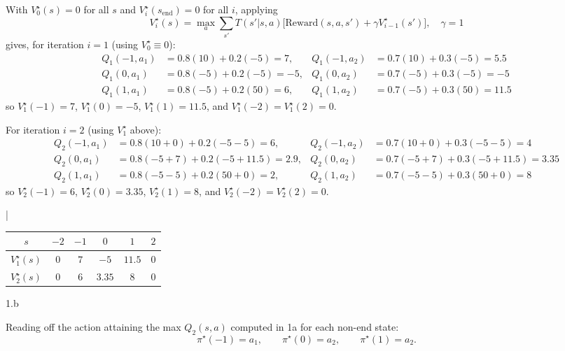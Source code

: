 \begin{answer}
  With $V^\star_0(s) = 0$ for all $s$ and $V^\star_i(s_\text{end}) = 0$ for all $i$, applying
  $$V^\star_i(s) = \max_a \sum_{s'} T(s'\vert s,a)\big[\text{Reward}(s,a,s') + \gamma V^\star_{i-1}(s')\big], \quad \gamma = 1$$
  gives, for iteration $i=1$ (using $V^\star_0 \equiv 0$):
  \begin{align*}
    Q_1(-1,a_1) &= 0.8(10) + 0.2(-5) = 7, &
    Q_1(-1,a_2) &= 0.7(10) + 0.3(-5) = 5.5 \\
    Q_1(0,a_1) &= 0.8(-5) + 0.2(-5) = -5, &
    Q_1(0,a_2) &= 0.7(-5) + 0.3(-5) = -5 \\
    Q_1(1,a_1) &= 0.8(-5) + 0.2(50) = 6, &
    Q_1(1,a_2) &= 0.7(-5) + 0.3(50) = 11.5
  \end{align*}
  so $V^\star_1(-1) = 7$, $V^\star_1(0) = -5$, $V^\star_1(1) = 11.5$, and $V^\star_1(-2) = V^\star_1(2) = 0$.

  For iteration $i=2$ (using $V^\star_1$ above):
  \begin{align*}
    Q_2(-1,a_1) &= 0.8(10+0) + 0.2(-5-5) = 6, &
    Q_2(-1,a_2) &= 0.7(10+0) + 0.3(-5-5) = 4 \\
    Q_2(0,a_1) &= 0.8(-5+7) + 0.2(-5+11.5) = 2.9, &
    Q_2(0,a_2) &= 0.7(-5+7) + 0.3(-5+11.5) = 3.35 \\
    Q_2(1,a_1) &= 0.8(-5-5) + 0.2(50+0) = 2, &
    Q_2(1,a_2) &= 0.7(-5-5) + 0.3(50+0) = 8
  \end{align*}
  so $V^\star_2(-1) = 6$, $V^\star_2(0) = 3.35$, $V^\star_2(1) = 8$, and $V^\star_2(-2) = V^\star_2(2) = 0$.

  \begin{center}
  \lstDeleteShortInline|
  \begin{tabular}{|c|c|c|c|c|c|}
    \hline
    $s$ & $-2$ & $-1$ & $0$ & $1$ & $2$ \\
    \hline
    $V^\star_1(s)$ & $0$ & $7$ & $-5$ & $11.5$ & $0$ \\
    \hline
    $V^\star_2(s)$ & $0$ & $6$ & $3.35$ & $8$ & $0$ \\
    \hline
  \end{tabular}
  \end{center}
\end{answer}
\clearpage

\LARGE
1.b
\normalsize

\begin{answer}
  Reading off the action attaining the max $Q_2(s,a)$ computed in 1a for each non-end state:
  $$\pi^\star(-1) = a_1, \qquad \pi^\star(0) = a_2, \qquad \pi^\star(1) = a_2.$$
\end{answer}
\clearpage

